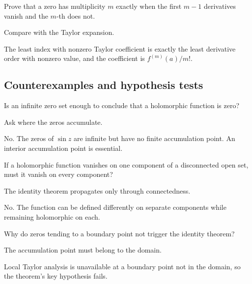 \begin{exercise}\label{exr:iv07-expand-09}
Prove that a zero has multiplicity \(m\) exactly when the first \(m-1\) derivatives vanish and the \(m\)-th does not.
\end{exercise}
\begin{hint}
Compare with the Taylor expansion.
\end{hint}
\begin{solution}
The least index with nonzero Taylor coefficient is exactly the least derivative order with nonzero value, and the coefficient is \(f^{(m)}(a)/m!\).
\end{solution}

\subsection*{Counterexamples and hypothesis tests}

\begin{exercise}\label{exr:iv07-expand-10}
Is an infinite zero set enough to conclude that a holomorphic function is zero?
\end{exercise}
\begin{hint}
Ask where the zeros accumulate.
\end{hint}
\begin{solution}
No. The zeros of \(\sin z\) are infinite but have no finite accumulation point. An interior accumulation point is essential.
\end{solution}

\begin{exercise}\label{exr:iv07-expand-11}
If a holomorphic function vanishes on one component of a disconnected open set, must it vanish on every component?
\end{exercise}
\begin{hint}
The identity theorem propagates only through connectedness.
\end{hint}
\begin{solution}
No. The function can be defined differently on separate components while remaining holomorphic on each.
\end{solution}

\begin{exercise}\label{exr:iv07-expand-12}
Why do zeros tending to a boundary point not trigger the identity theorem?
\end{exercise}
\begin{hint}
The accumulation point must belong to the domain.
\end{hint}
\begin{solution}
Local Taylor analysis is unavailable at a boundary point not in the domain, so the theorem's key hypothesis fails.
\end{solution}

